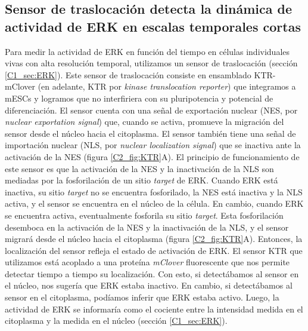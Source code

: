 \documentclass[./main.tex]{subfiles}
\begin{document}
\subsection{Sensor de traslocación detecta la dinámica de actividad de ERK en escalas temporales cortas}
\label{C2_ssec:sensor}

Para medir la actividad de ERK en función del tiempo en células individuales vivas con alta resolución temporal, utilizamos un sensor de traslocación (sección \ref{C1_sec:ERK}).  Este sensor de traslocación consiste en ensamblado KTR-mClover (en adelante, KTR por \textit{kinase translocation reporter}) que integramos a mESCs y logramos que no interfiriera con su pluripotencia y potencial de diferenciación. El sensor cuenta con una señal de exportación nuclear (NES, por \textit{nuclear exportation signal}) que, cuando se activa, promueve la migración del sensor desde el núcleo hacia el citoplasma. El sensor también tiene una señal de importación nuclear (NLS, por \textit{nuclear localization signal}) que se inactiva ante la activación de la NES (figura \ref{C2_fig:KTR}A). El principio de funcionamiento de este sensor es que la activación de la NES y la inactivación de la NLS son mediadas por la fosforilación de un sitio \textit{target} de ERK. Cuando ERK está inactiva, su sitio \textit{target} no se encuentra fosforilado, la NES está inactiva y la NLS activa, y el sensor se encuentra en el núcleo de la célula. En cambio, cuando ERK se encuentra activa, eventualmente fosforila su sitio \textit{target}. Esta fosforilación desemboca en la activación de la NES y la inactivación de la NLS, y el sensor migrará desde el núcleo hacia el citoplasma (figura \ref{C2_fig:KTR}A). Entonces, la localización del sensor refleja el estado de activación de ERK. El sensor KTR que utilizamos está acoplado a una proteína \textit{mClover} fluorescente que nos permite detectar tiempo a tiempo su localización. Con esto, si detectábamos al sensor en el núcleo, nos sugería que ERK estaba inactivo. En cambio, si detectábamos al sensor en el citoplasma, podíamos inferir que ERK estaba activo. Luego, la actividad de ERK se informaría como el cociente entre la intensidad medida en el citoplasma y la medida en el núcleo \cite{Regot2014} (sección \ref{C1_sec:ERK}).
\end{document}
